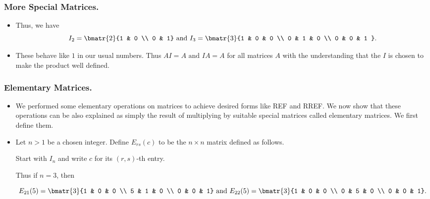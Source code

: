 \begin{frame}%
  \frametitle{More Special Matrices.}
  \begin{itemize}%
\item Thus, we have
$$I_2 = \bmatr{2}{1 & 0 \\ 0 & 1} \mbox{ and } I_3 =
\bmatr{3}{1 & 0 & 0 \\
          0 & 1 & 0 \\
          0 & 0 & 1 }.$$

\item These behave like $1$ in our usual numbers. Thus
$AI = A \mbox{ and } IA = A $
for all matrices $A$ with the understanding that the $I$ is chosen to
make the product well defined.




\end{itemize}
\end{frame}

\begin{frame}%
  \frametitle{ Elementary Matrices.}
  \begin{itemize}%
 
\item We performed some elementary operations on matrices to achieve
desired forms like REF and RREF. We now show that these operations can
be also explained as simply the result of multiplying by suitable
special matrices called elementary matrices. We first define them.


\item Let $n>1$ be a chosen integer.
Define $E_{rs}(c)$ to be the $n\times n $ matrix defined as follows.

Start with $I_n$ and write $c$ for its $(r,s)$-th entry.

Thus if $n=3$, then

$$E_{21}(5) = \bmatr{3}{1 & 0 & 0 \\
                        5 & 1 & 0 \\
                        0 & 0 & 1}
\mbox{ and }
E_{22}(5) = \bmatr{3}{1 & 0 & 0 \\
                      0 & 5 & 0 \\
                      0 & 0 & 1}.$$

\end{itemize}
\end{frame}

